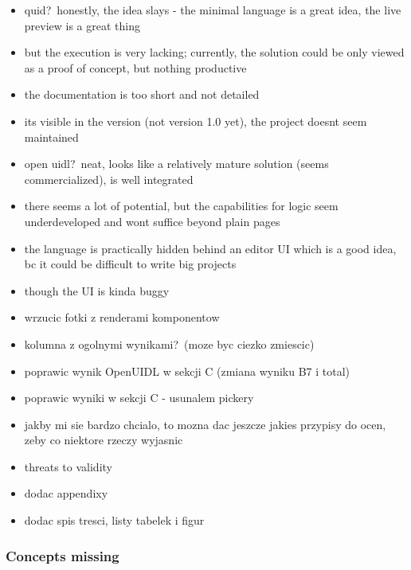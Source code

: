 \begin{itemize}
    \item quid?\ honestly, the idea slays - the minimal language is a great idea, the live preview is a great thing
    \item but the execution is very lacking; currently, the solution could be only viewed as a proof of concept, but nothing productive
    \item the documentation is too short and not detailed
    \item its visible in the version (not version 1.0 yet), the project doesnt seem maintained
    \item open uidl?\ neat, looks like a relatively mature solution (seems commercialized), is well integrated
    \item there seems a lot of potential, but the capabilities for logic seem underdeveloped and wont suffice beyond plain pages
    \item the language is practically hidden behind an editor UI which is a good idea, bc it could be difficult to write big projects
    \item though the UI is kinda buggy
\end{itemize}

\begin{itemize}
    \item wrzucic fotki z renderami komponentow
    \item kolumna z ogolnymi wynikami?\ (moze byc ciezko zmiescic)
    \item poprawic wynik OpenUIDL w sekcji C (zmiana wyniku B7 i total)
    \item poprawic wyniki w sekcji C - usunalem pickery
    \item jakby mi sie bardzo chcialo, to mozna dac jeszcze jakies przypisy do ocen, zeby co niektore rzeczy wyjasnic
    \item threats to validity
\end{itemize}

\begin{itemize}
    \item dodac appendixy
    \item dodac spis tresci, listy tabelek i figur
\end{itemize}

\subsubsection{Concepts missing}

